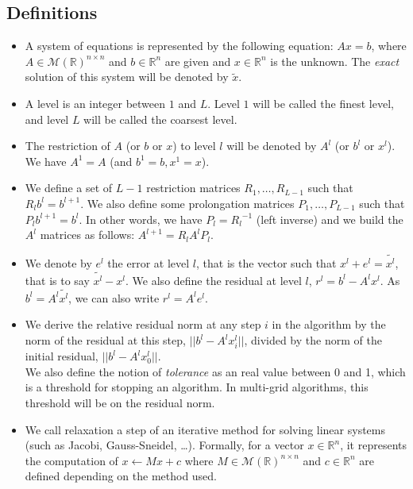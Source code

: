 \subsection{Definitions}

\begin{itemize}
 \item A system of equations is represented by the following equation: $Ax=b$, where $A \in \mathcal{M}(\mathbb{R})^{n\times n}$ and $b \in \mathcal{\mathbb{R}}^n$ are given and
 $x \in \mathbb{R}^n$ is the unknown. The \emph{exact} solution of this system will be denoted by $\widetilde{x}$.
 \item A level is an integer between $1$ and $L$. Level $1$ will be called the finest level, and level $L$ will be called the coarsest level.
 \item The restriction of $A$ (or $b$ or $x$) to level $l$ will be denoted by $A^l$ (or $b^l$ or $x^l$). We have $A^1 = A$ (and $b^1=b,x^1=x$).
 \item We define a set of $L-1$ restriction matrices $R_1,\dots,R_{L-1}$ such that $R_l b^l = b^{l+1}$. We also define some prolongation matrices $P_1,\dots,P_{L-1}$ such that $P_{l}b^{l+1} = b^l$.
 In other words, we have $P_l = {R_l}^{-1}$ (left inverse) and we build the $A^l$ matrices as follows: $A^{l+1} = R_l A^l P_l$.
 \item We denote by $e^l$ the error at level $l$, that is the vector such that $x^l + e^l = \widetilde{x^l}$, that is to say $\widetilde{x^l}-x^l$.
 We also define the residual at level $l$, $r^l = b^l - A^lx^l$. As $b^l = A^l\widetilde{x^l}$, we can also write $r^l = A^le^l$.
 \item We derive the relative residual norm at any step $i$ in the algorithm
 by the norm of the residual at this step, $||b^l - A^lx^l_i||$, divided by the norm of the initial residual, $|| b^l - A^lx^l_0||$.\\ We also define the notion of \emph{tolerance}
 as an real value between 0 and 1, which is a threshold for stopping an algorithm. In multi-grid algorithms, this threshold will be on the residual norm.
 \item We call relaxation a step of an iterative method for solving linear systems (such as Jacobi, Gauss-Sneidel, \dots). Formally, for a vector $x \in \mathbb{R}^n$, it represents the computation of
 $x \leftarrow Mx + c$ where $M \in \mathcal{M}(\mathbb{R})^{n\times n}$ and $c \in \mathcal{\mathbb{R}}^n$ are defined depending on the method used.
\end{itemize}


